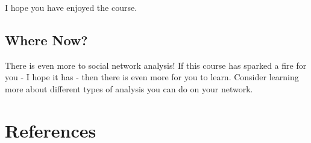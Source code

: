 \documentclass[
  letterpaper,
  DIV=11,
  numbers=noendperiod]{scrreprt}
\newlength{\cslhangindent}
\newenvironment{CSLReferences}[2] %
 {\begin{list}{}{%
  \setlength{\itemindent}{0pt}
  \setlength{\leftmargin}{0pt}
  \setlength{\parsep}{0pt}
  \ifodd #1
   \setlength{\leftmargin}{\cslhangindent}
   \setlength{\itemindent}{-1\cslhangindent}
  \fi
  \setlength{\itemsep}{#2\baselineskip}}}
 {\end{list}}
\begin{document}
I hope you have enjoyed the course.

\section{Where Now?}\label{where-now}

There is even more to social network analysis! If this course has
sparked a fire for you - I hope it has - then there is even more for you
to learn. Consider learning more about different types of analysis you
can do on your network.


\chapter*{References}\label{references}


\label{refs}
\begin{CSLReferences}{0}{1}
\end{CSLReferences}
\end{document}
